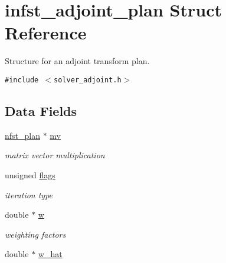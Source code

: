 \hypertarget{structinfst__adjoint__plan}{
\section{infst\_\-adjoint\_\-plan Struct Reference}
\label{structinfst__adjoint__plan}
}
Structure for an adjoint transform plan.  


{\tt \#include $<$solver\_\-adjoint.h$>$}

\subsection*{Data Fields}
\begin{CompactItemize}
\item 
\hypertarget{structinfst__adjoint__plan_02395790ff1d9e7ffc2e3fae3b927df0}{
\hyperlink{structnfst__plan}{nfst\_\-plan} $\ast$ \hyperlink{structinfst__adjoint__plan_02395790ff1d9e7ffc2e3fae3b927df0}{mv}}
\label{structinfst__adjoint__plan_02395790ff1d9e7ffc2e3fae3b927df0}

\begin{CompactList}\small\item\em matrix vector multiplication \item\end{CompactList}\item 
\hypertarget{structinfst__adjoint__plan_8771c95bc65a49fe974389825f005ec9}{
unsigned \hyperlink{structinfst__adjoint__plan_8771c95bc65a49fe974389825f005ec9}{flags}}
\label{structinfst__adjoint__plan_8771c95bc65a49fe974389825f005ec9}

\begin{CompactList}\small\item\em iteration type \item\end{CompactList}\item 
\hypertarget{structinfst__adjoint__plan_5b64034f7c01c3ce0a7ab02fd8477bdc}{
double $\ast$ \hyperlink{structinfst__adjoint__plan_5b64034f7c01c3ce0a7ab02fd8477bdc}{w}}
\label{structinfst__adjoint__plan_5b64034f7c01c3ce0a7ab02fd8477bdc}

\begin{CompactList}\small\item\em weighting factors \item\end{CompactList}\item 
\hypertarget{structinfst__adjoint__plan_00f860d5af6ada0c99a252b5d7548f5b}{
double $\ast$ \hyperlink{structinfst__adjoint__plan_00f860d5af6ada0c99a252b5d7548f5b}{w\_\-hat}}
\label{structinfst__adjoint__plan_00f860d5af6ada0c99a252b5d7548f5b}


\end{CompactItemize}
